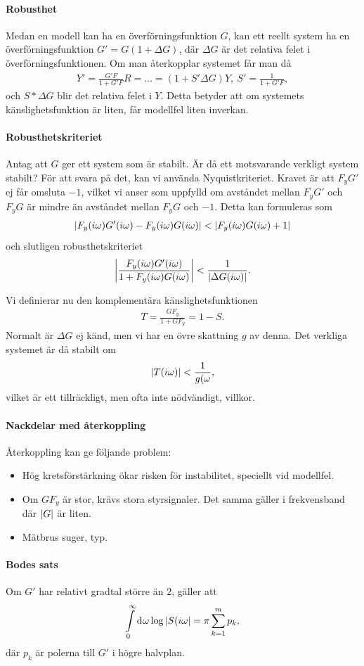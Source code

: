 \paragraph{Robusthet}
Medan en modell kan ha en överförningsfunktion $G$, kan ett reellt system ha en överförningsfunktion $G' = G(1 + \Delta G)$, där $\Delta G$ är det relativa felet i överförningsfunktionen. Om man återkopplar systemet får man då
\begin{align*}
	Y' = \frac{G'F}{1 + G'F}R = \dots = (1 + S'\Delta G)Y,\ S' = \frac{1}{1 + G'F},
\end{align*}
och $S*\Delta G$ blir det relativa felet i $Y$. Detta betyder att om systemets känslighetsfunktion är liten, får modellfel liten inverkan.

\paragraph{Robusthetskriteriet}
Antag att $G$ ger ett system som är stabilt. Är då ett motsvarande verkligt system stabilt? För att svara på det, kan vi använda Nyquistkriteriet. Kravet är att $F_{y}G'$ ej får omsluta $-1$, vilket vi anser som uppfylld om avståndet mellan $F_{y}G'$ och $F_{y}G$ är mindre än avståndet mellan $F_{y}G$ och $-1$. Detta kan formuleras som
\begin{align*}
	\abs{F_{y}(i\omega)G'(i\omega) - F_{y}(i\omega)G(i\omega)} < \abs{F_{y}(i\omega)G(i\omega) + 1}
\end{align*}
och slutligen robusthetskriteriet
\begin{align*}
	\abs{\frac{F_{y}(i\omega)G'(i\omega)}{1 + F_{y}(i\omega)G(i\omega)}} < \frac{1}{\abs{\Delta G(i\omega)}}.
\end{align*}

Vi definierar nu den komplementära känslighetsfunktionen
\begin{align*}
	T = \frac{GF_{y}}{1 + GF_{y}} = 1 - S.
\end{align*}
Normalt är $\Delta G$ ej känd, men vi har en övre skattning $g$ av denna. Det verkliga systemet är då stabilt om
\begin{align*}
	\abs{T(i\omega)} < \frac{1}{g(\omega},
\end{align*}
vilket är ett tillräckligt, men ofta inte nödvändigt, villkor.

\paragraph{Nackdelar med återkoppling}
Återkoppling kan ge följande problem:
\begin{itemize}
	\item Hög kretsförstärkning ökar risken för instabilitet, speciellt vid modellfel.
	\item Om $GF_{y}$ är stor, krävs stora styrsignaler. Det samma gäller i frekvensband där $\abs{G}$ är liten.
	\item Mätbrus suger, typ.
\end{itemize}

\paragraph{Bodes sats}
Om $G'$ har relativt gradtal större än $2$, gäller att
\begin{align*}
	\int\limits_{0}^{\infty}\dd[]{\omega}\log{\abs{S(i\omega}} = \pi\sum\limits_{k = 1}^{m}p_{k},
\end{align*}
där $p_{k}$ är polerna till $G'$ i högre halvplan.